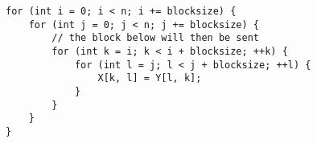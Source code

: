 \documentclass[12pt]{article}
\begin{document}
\begin{verbatim}
for (int i = 0; i < n; i += blocksize) {
    for (int j = 0; j < n; j += blocksize) {
        // the block below will then be sent
        for (int k = i; k < i + blocksize; ++k) {
            for (int l = j; l < j + blocksize; ++l) {
                X[k, l] = Y[l, k];
            }
        }
    }
}
\end{verbatim}

\end{document}
